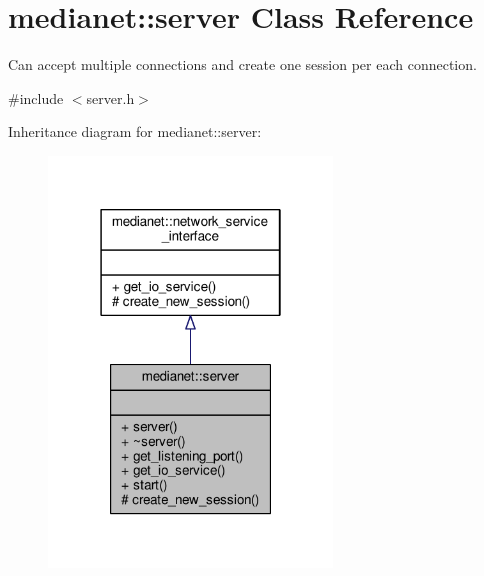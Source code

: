 \hypertarget{classmedianet_1_1server}{}\section{medianet\+::server Class Reference}
\label{classmedianet_1_1server}


Can accept multiple connections and create one session per each connection.  




{\ttfamily \#include $<$server.\+h$>$}



Inheritance diagram for medianet\+::server\+:
\nopagebreak
\begin{figure}[H]
\begin{center}
\leavevmode
\includegraphics[width=214pt]{classmedianet_1_1server__inherit__graph}
\end{center}
\end{figure}


